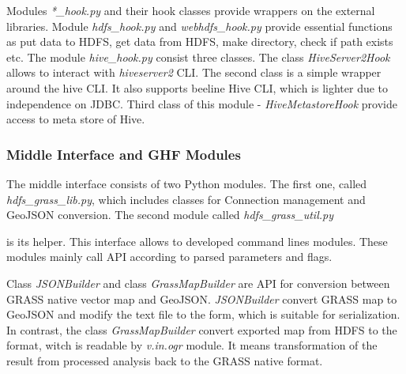 \documentclass[a4paper,12pt,oneside]{report}
\begin{document}
	Modules \textit{*\_hook.py} and their hook classes provide wrappers on the
	external libraries. Module \textit{hdfs\_hook.py} and \textit{webhdfs\_hook.py}
	provide essential functions as put data to HDFS, get data from HDFS, make
	directory, check if path exists etc. 
	The module \textit{ hive\_hook.py} consist three classes. The class
	\textit{HiveServer2Hook} allows to interact with \textit{hiveserver2} CLI. The
	second class is a simple wrapper around the hive CLI. It also supports beeline
	Hive CLI, which is lighter due to independence on JDBC. Third class of this
	module -  \textit{HiveMetastoreHook} provide access to meta store of Hive. 
	
	\subsubsection{Middle Interface and GHF Modules}
	The middle interface consists of two Python modules. The first one, called
	\textit{hdfs\_grass\_lib.py}, which includes classes for Connection management
	and GeoJSON conversion.  The second module called \textit{hdfs\_grass\_util.py}

	is its helper. This interface allows to developed command lines
	modules. These modules mainly call API according to parsed parameters and flags.  
	
	Class \textit{JSONBuilder} and class \textit{GrassMapBuilder} are API for
	conversion between GRASS native vector map and GeoJSON.  \textit{JSONBuilder}
	convert GRASS map to GeoJSON and modify the text file to the form, which is
	suitable for serialization. In contrast, the class \textit{GrassMapBuilder}
	convert exported map from HDFS to the format, witch is readable by
	\textit{v.in.ogr} module. It means transformation of the result from processed analysis back
	to the GRASS native format.
	
\end{document}
